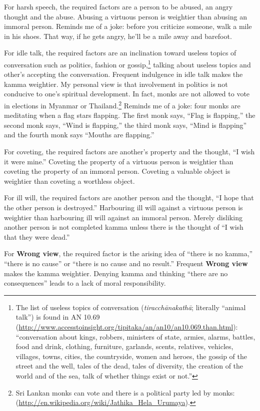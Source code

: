 For harsh speech, the required factors are a person to be abused, an angry thought and the abuse. Abusing a virtuous person is weightier than abusing an immoral person. Reminds me of a joke: before you criticize someone, walk a mile in his shoes. That way, if he gets angry, he’ll be a mile away and barefoot.

For idle talk, the required factors are an inclination toward useless topics of conversation such as politics, fashion or gossip,\footnote{The list of useless topics of conversation (\textit{tiracchānakathā}; literally “animal talk”) is found in AN 10.69 (\url{http://www.accesstoinsight.org/tipitaka/an/an10/an10.069.than.html}): “conversation about kings, robbers, ministers of state, armies, alarms, battles, food and drink, clothing, furniture, garlands, scents, relatives, vehicles, villages, towns, cities, the countryside, women and heroes, the gossip of the street and the well, tales of the dead, tales of diversity, the creation of the world and of the sea, talk of whether things exist or not.”} talking about useless topics and other’s accepting the conversation. Frequent indulgence in idle talk makes the kamma weightier. My personal view is that involvement in politics is not conducive to one’s spiritual development. In fact, monks are not allowed to vote in elections in Myanmar or Thailand.\footnote{Sri Lankan monks can vote and there is a political party led by monks: (\url{http://en.wikipedia.org/wiki/Jathika_Hela_Urumaya}).} Reminds me of a joke: four monks are meditating when a flag stars flapping. The first monk says, “Flag is flapping,” the second monk says, “Wind is flapping,” the third monk says, “Mind is flapping” and the fourth monk says “Mouths are flapping.”

For coveting, the required factors are another’s property and the thought, “I wish it were mine.” Coveting the property of a virtuous person is weightier than coveting the property of an immoral person. Coveting a valuable object is weightier than coveting a worthless object.

For ill will, the required factors are another person and the thought, “I hope that the other person is destroyed.” Harbouring ill will against a virtuous person is weightier than harbouring ill will against an immoral person. Merely disliking another person is not completed kamma unless there is the thought of “I wish that they were dead.”

For \textbf{Wrong view}, the required factor is the arising idea of “there is no kamma,” “there is no cause” or “there is no cause and no result.” Frequent \textbf{Wrong view} makes the kamma weightier. Denying kamma and thinking “there are no consequences” leads to a lack of moral responsibility.

